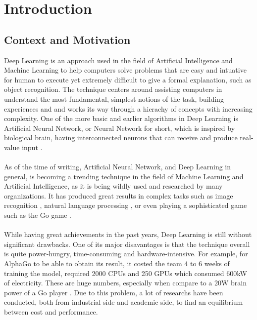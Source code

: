 \chapter{Introduction}

\section{Context and Motivation}
Deep Learning is an approach used in the field of Artificial Intelligence and Machine Learning to help computers solve problems that are easy and intuative for human to execute yet extremely difficult to give a formal explanation, such as object recognition. The technique centers around assisting computers in understand the most fundamental, simplest notions of the task, building experiences and and works its way through a hierachy of concepts with increasing complexity. One of the more basic and earlier algorithms in Deep Learning is Artificial Neural Network, or Neural Network for short, which is inspired by biological brain, having interconnected neurons that can receive and produce real-value input \cite{Goodfellow-et-al-2016}. \\
~\\
As of the time of writing, Artificial Neural Network, and Deep Learning in general, is becoming a trending technique in the field of Machine Learning and Artificial Intelligence, as it is being wildly used and researched by many organizations. It has produced great results in complex tasks such as image recognition \cite{Krizhevsky:2012:ICD:2999134.2999257}, natural language processing \cite{recent-advances-in-deep-learning-for-speech-research-at-microsoft}, or even playing a sophisticated game such as the Go game \cite{GoGame}. \\ 
~\\
While having great achievements in the past years, Deep Learning is still without significant drawbacks. One of its major disavantages is that the technique overall is quite power-hungry, time-consuming and hardware-intensive. For example, for AlphaGo to be able to obtain its result, it costed the team 4 to 6 weeks of training the model, required 2000 CPUs and 250 GPUs which consumed 600kW of electricity. These are huge numbers, especially when compare to a 20W brain power of a Go player \cite{GoGame}. Due to this problem, a lot of researchs have been conducted, both from industrial side and academic side, to find an equilibrium between cost and performance. \\
